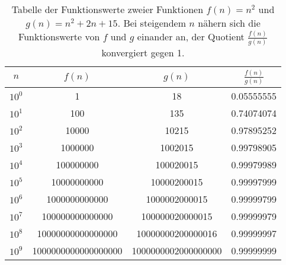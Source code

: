 \begin{table}[htb]
    \centering
    \begin{tabular}{c c c c}
        \toprule
        $n$ & $f(n)$ & $g(n)$ & $\frac{f(n)}{g(n)}$ \\\midrule
        $10^0$ & 1 & 18 & 0.05555555 \\
        $10^1$ & 100 & 135 & 0.74074074 \\
        $10^2$ & 10000 & 10215 & 0.97895252 \\
        $10^3$ & 1000000 & 1002015 & 0.99798905 \\
        $10^4$ & 100000000 & 100020015 & 0.99979989 \\
        $10^5$ & 10000000000 & 10000200015 & 0.99997999 \\
        $10^6$ & 1000000000000 & 1000002000015 & 0.99999799 \\
        $10^7$ & 100000000000000 & 100000020000015 & 0.99999979 \\
        $10^8$ & 10000000000000000 & 10000000200000016 & 0.99999997 \\
        $10^9$ & 1000000000000000000 & 1000000002000000000 & 0.99999999 \\
        \bottomrule
    \end{tabular}
    \caption{Tabelle der Funktionswerte zweier Funktionen $f(n) = n^2$ und $g(n) = n^2 + 2n + 15$. Bei steigendem $n$ nähern sich die Funktionswerte von $f$ und $g$ einander an, der Quotient $\frac{f(n)}{g(n)}$ konvergiert gegen 1.}
    \label{tab:unimportant-constants}
\end{table}
